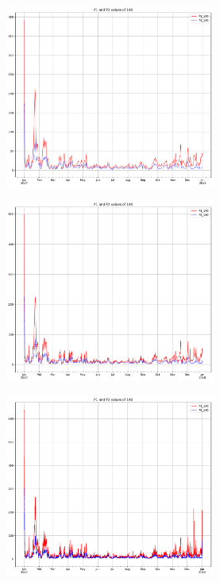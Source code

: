 \documentclass[12pt,a4paper,twoside]{scrartcl}
\numberwithin{equation}{section}
\begin{document}
\begin{figure}[H]
  \centering
  \begin{subfigure}[t]{0.32\textwidth}
    \includegraphics[width=\textwidth,height=6cm]{figures/1D_140_plot}%
    \label{fig:y equals x}
    \caption{}
  \end{subfigure}
  \begin{subfigure}[t]{0.32\textwidth}
    \includegraphics[width=\textwidth,height=6cm]{figures/12H_140_plot}%
    \label{fig:y equals x}
    \caption{}
  \end{subfigure}
  \begin{subfigure}[t]{0.32\textwidth}
    \includegraphics[width=\textwidth,height=6cm]{figures/1H_140_plot}%
    \label{fig:y equals x}
    \caption{}
  \end{subfigure}


\end{figure}
\end{document}
